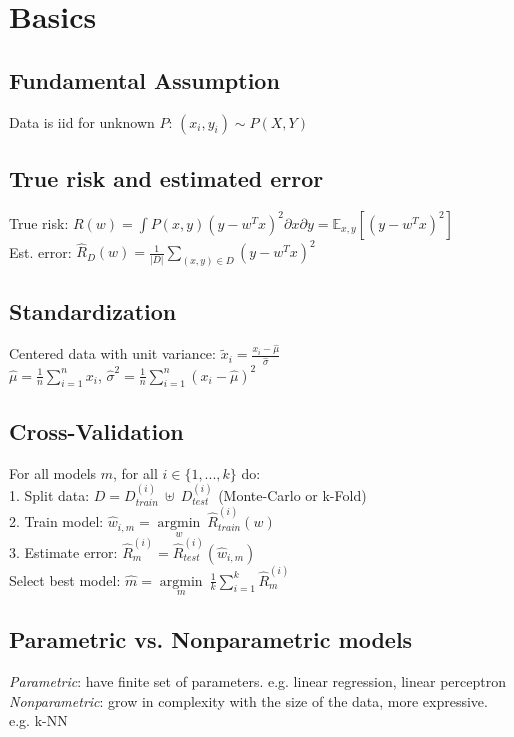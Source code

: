\section*{Basics}

\subsection*{Fundamental Assumption}
Data is iid for unknown $P$: $(x_i, y_i) \sim P(X,Y)$

\subsection*{True risk and estimated error}
True risk: $R(w) = \int P(x,y) (y-w^Tx)^2 \partial x \partial y = \mathbb{E}_{x,y}[(y-w^Tx)^2]$ \\
Est. error: $\hat{R}_D(w) = \frac{1}{|D|}\sum_{(x,y)\in D} (y-w^Tx)^2$

\subsection*{Standardization}
Centered data with unit variance:
$\tilde{x}_{i} = \frac{x_{i}-\hat{\mu}}{\hat{\sigma}}$\\
$\hat{\mu} = \frac{1}{n}\sum_{i=1}^n x_{i}$, $\hat{\sigma}^2 = \frac{1}{n}\sum_{i=1}^n {(x_{i}-\hat{\mu})}^2$ 

\subsection*{Cross-Validation}
For all models $m$, for all $i \in \{ 1, ..., k \}$ do:\\
1. Split data: $D = D_{train}^{(i)} ~ \uplus ~ D_{test}^{(i)} $ (Monte-Carlo or k-Fold) \\
2. Train model: $\hat{w}_{i,m} = \underset{w}{\operatorname{argmin}} ~ \hat{R}_{train}^{(i)} (w)$ \\
3. Estimate error: $\hat{R}_{m}^{(i)} = \hat{R}_{test}^{(i)} (\hat{w}_{i,m})$ \\
Select best model: $\hat{m} = \underset{m}{\operatorname{argmin}} ~ \frac{1}{k} \sum_{i=1}^{k} \hat{R}_{m}^{(i)}$

\subsection*{Parametric vs. Nonparametric models}
\emph{Parametric}: have finite set of parameters. 
e.g. linear regression, linear perceptron\\
\emph{Nonparametric}: grow in complexity with the size of the data, more expressive.
e.g. k-NN

